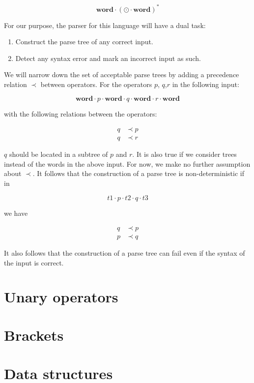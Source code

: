 \documentclass[10pt]{report}
\newcommand{\word}{\textbf{word}}
\begin{document}
\[   \textbf{word} \cdot (\odot \cdot \textbf{word} ) ^ {*} \]

For our purpose, the parser for this language will have a dual task:

\begin{enumerate}
	\item Construct the parse tree of any correct input.
	\item Detect any syntax error and mark an incorrect input as such.
\end{enumerate}

We will narrow down the set of acceptable parse trees by adding a precedence relation $\prec$ between operators.  For the operators $p$, $q$,$r$ in the following input:

\[ \word \cdot p \cdot \word \cdot q \cdot \word \cdot r \cdot \word \]

with the following relations between the operators:

\begin{align*}
	q & \prec p \\
	q & \prec r
\end{align*}

$q$ should be located in a subtree of $p$ and $r$.  It is also true if we consider trees instead of the words in the above input.  For now, we make no further assumption about $\prec$.  It follows that the construction of a parse tree is non-deterministic if in

\[
t1 \cdot p \cdot t2 \cdot q \cdot t3
\]

we have

\begin{align*}
	q & \prec p \\
	p & \prec q
\end{align*}

It also follows that the construction of a parse tree can fail even if the syntax of the input is correct.

\chapter{Unary operators}

\chapter{Brackets}

\chapter{Data structures}
\end{document}
